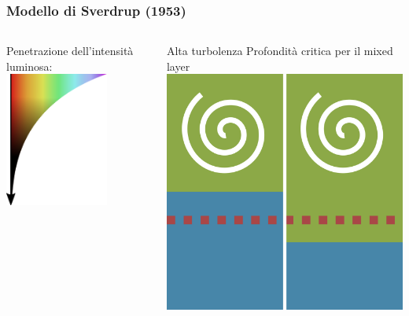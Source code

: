 \begin{frame}
  \frametitle{Modello di Sverdrup (1953)}
  \begin{columns}

    Penetrazione dell'intensità luminosa:    
    \includegraphics[width=0.7\textwidth]{../img/light_penetration}

    Alta turbolenza
    Profondità critica per il mixed layer
    \includegraphics[width=\textwidth]{../img/critical_depth}

  \end{columns}
\end{frame}

